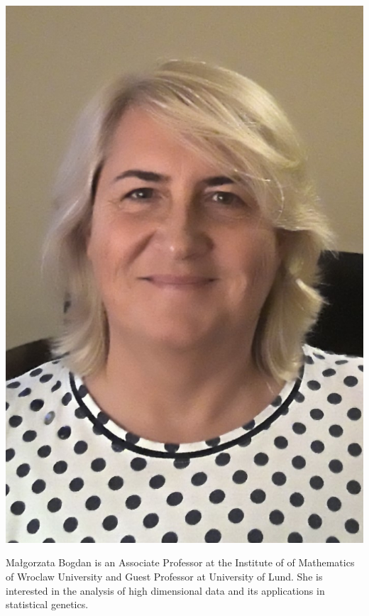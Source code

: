 \documentclass[]{MathAppl18}
\begin{document}
\begin{minipage}{0.2\textwidth}
        \includegraphics[width=1\textwidth]{Figures/Gosia.jpg}
\end{minipage}
\hspace{0.01\textwidth}
\begin{minipage}{0.7\textwidth}
Małgorzata Bogdan is an Associate Professor at the Institute of of Mathematics of Wroclaw University and Guest Professor at University of Lund. She is interested in the analysis of high dimensional data and its applications in statistical genetics.
\end{minipage}
\end{document}
